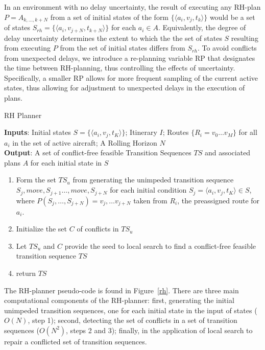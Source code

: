 \documentclass[letterpaper, 10 pt, conference]{ieeeconf}
\begin{document}
In an environment with no delay uncertainty, the result of executing any RH-plan $P =A_{k, \ldots,  k+N}$ from a set of initial states of the form $\{\langle a_i, v_j, t_k \rangle\}$ would be a set of states $S_{rh} = \{ \langle a_i, v_{j+N}, t_{k+N} \rangle \}$ for each $a_i \in A$. Equivalently, the degree of delay uncertainty determines the extent to which the the set of states $S$ resulting from executing $P$ from the set of initial states differs from $S_{rh}$. To avoid conflicts from unexpected delays, we introduce a re-planning variable RP that designates the time between RH-planning, thus controlling the effects of uncertainty. Specifically, a smaller RP allows for more frequent sampling of the current active states, thus allowing for adjustment to unexpected delays in the execution of plans.
\begin{algorithm}[H]
\caption{RH Planner}
\SetAlgoLined
{\bf Inputs}: Initial states $S = \{ \langle a_i, v_j, t_K \rangle \}$; Itinerary $I$;  Routes $ \{ R_i = v_0 \ldots v_M\}$ for all $a_i$ in the set of active aircraft; A Rolling Horizon $N$ \\
{\bf Output}: A set of conflict-free feasible Transition Sequences $TS$ and associated plans $A$ for each initial state in $S$
\begin{enumerate}
\item Form the set $TS_u$ from generating the unimpeded transition sequence $S_j, move, S_{j+1} \ldots , move, S_{j+N}$ for each initial condition $S_j = \langle a_i, v_j, t_K \rangle \in S$, where $P(S_j, \ldots, S_{j+N}) = v_j, \ldots v_{j+N}$ taken from $R_i$, the preassigned route for $a_i$.
\item Initialize the set $C$ of conflicts in $TS_u$
\item Let $TS_u$ and $C$ provide the seed to local search to find a conflict-free feasible transition sequence $TS$
\item return $TS$
\end{enumerate}
\label{rh}
\end{algorithm}

The RH-planner pseudo-code is found in Figure~\ref{rh}. There are three main computational components of the RH-planner: first, generating the initial unimpeded transition sequences, one for each initial state in the input of states ($O(N)$, step 1); second, detecting the set of conflicts in a set of transition sequences ($O(N^2)$, steps 2 and 3); finally, in the application of local search to repair a conflicted set of transition sequences.
\end{document}
